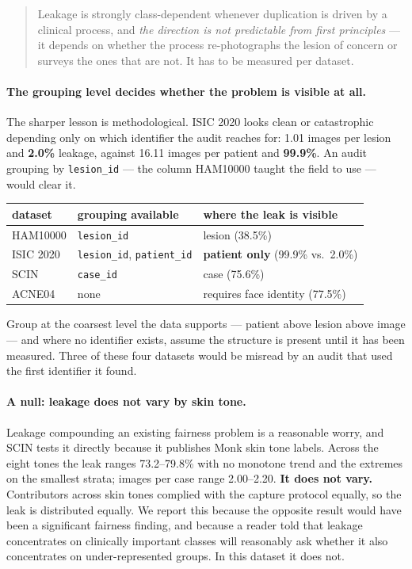 \documentclass[11pt]{article}
\begin{document}
\begin{quote}
Leakage is strongly class-dependent whenever duplication is driven by a clinical process,
and \emph{the direction is not predictable from first principles} --- it depends on whether
the process re-photographs the lesion of concern or surveys the ones that are not. It has to
be measured per dataset.
\end{quote}

\paragraph{The grouping level decides whether the problem is visible at all.}
The sharper lesson is methodological. ISIC 2020 looks clean or catastrophic depending only
on which identifier the audit reaches for: 1.01 images per lesion and \textbf{2.0\%}
leakage, against 16.11 images per patient and \textbf{99.9\%}. An audit grouping by
\texttt{lesion\_id} --- the column HAM10000 taught the field to use --- would clear it.

\begin{center}
\begin{tabular}{lll}
\toprule
dataset & grouping available & where the leak is visible \\
\midrule
HAM10000 & \texttt{lesion\_id} & lesion (38.5\%) \\
ISIC 2020 & \texttt{lesion\_id}, \texttt{patient\_id} & \textbf{patient only} (99.9\% vs.\ 2.0\%) \\
SCIN & \texttt{case\_id} & case (75.6\%) \\
ACNE04 & none & requires face identity (77.5\%) \\
\bottomrule
\end{tabular}
\end{center}

Group at the coarsest level the data supports --- patient above lesion above image --- and
where no identifier exists, assume the structure is present until it has been measured.
Three of these four datasets would be misread by an audit that used the first identifier it
found.

\paragraph{A null: leakage does not vary by skin tone.}
Leakage compounding an existing fairness problem is a reasonable worry, and SCIN tests it
directly because it publishes Monk skin tone labels. Across the eight tones the leak ranges
73.2--79.8\% with no monotone trend and the extremes on the smallest strata; images per case
range 2.00--2.20. \textbf{It does not vary.} Contributors across skin tones complied with
the capture protocol equally, so the leak is distributed equally. We report this because the
opposite result would have been a significant fairness finding, and because a reader told
that leakage concentrates on clinically important classes will reasonably ask whether it
also concentrates on under-represented groups. In this dataset it does not.
\end{document}

